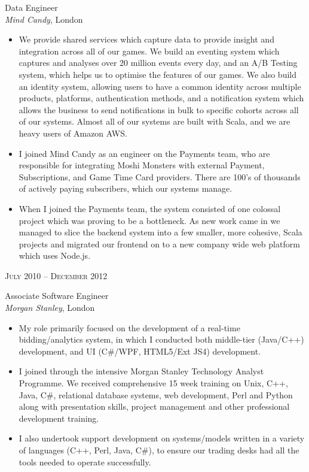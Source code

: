 \documentclass[10pt]{article} %
\begin{document}
{\begin{minipage}[t]{0.5\textwidth}
{\raggedright\large Data Engineer\\
\textit{Mind Candy}, London\\[5pt]}

\normalsize{
\begin{itemize}
\item We provide shared services which capture data to provide insight and integration across all of our games. We build an eventing system which captures and analyses over 20 million events every day, and an A/B Testing system, which helps us to optimise the features of our games. We also build an identity system, allowing users to have a common identity across multiple products, platforms, authentication methods, and a notification system which allows the business to send notifications in bulk to specific cohorts across all of our systems. Almost all of our systems are built with Scala, and we are heavy users of Amazon AWS.
\item I joined Mind Candy as an engineer on the Payments team, who are responsible for integrating Moshi Monsters with external Payment, Subscriptions, and Game Time Card providers. There are 100's of thousands of actively paying subscribers, which our systems manage.
\item When I joined the Payments team, the system consisted of one colossal project which was proving to be a bottleneck. As new work came in we managed to slice the backend system into a few smaller, more cohesive, Scala projects and migrated our frontend on to a new company wide web platform which uses Node.js.
\end{itemize}}


{\raggedleft\textsc{July 2010 -- December 2012}\par}

{\raggedright\large Associate Software Engineer\\
\textit{Morgan Stanley}, London\\[5pt]}

\normalsize{
\begin{itemize}
	\item My role primarily focused on the development of a real-time bidding/analytics system, in which I conducted both middle-tier (Java/C++) development, and UI (C\#/WPF, HTML5/Ext JS4) development.
	\item I joined through the intensive Morgan Stanley Technology Analyst Programme. We received comprehensive 15 week training on Unix, C++, Java, C\#, relational database systems, web development, Perl and Python along with presentation skills, project management and other professional development training.
	\item I also undertook support development on systems/models written in a variety of languages (C++, Perl, Java, C\#), to ensure our trading desks had all the tools needed to operate successfully.
\end{itemize}}


\end{minipage}}
\end{document}
